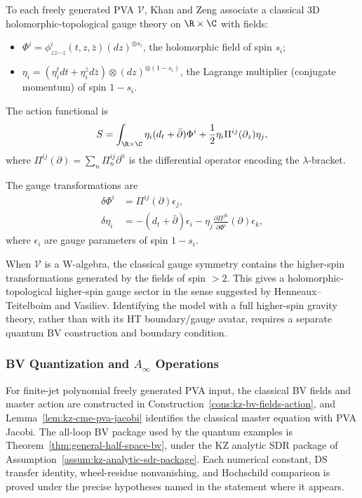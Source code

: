 \begin{construction}
To each freely generated PVA $\mathcal{V}$, Khan and Zeng associate a classical 3D holomorphic-topological gauge theory on $\R \times \C$ with fields:
\begin{itemize}
\item $\Phi^i = \phi^i_{zz\cdots z}(t,z,\bar{z})(dz)^{\otimes s_i}$, the holomorphic field of spin $s_i$;
\item $\eta_i = (\eta_i^t dt + \eta_i^{\bar{z}} d\bar{z}) \otimes (dz)^{\otimes(1-s_i)}$, the Lagrange multiplier (conjugate momentum) of spin $1-s_i$.
\end{itemize}
The action functional is
\begin{equation}
S = \int_{\R \times \C} \eta_i (d_t + \bar{\partial})\Phi^i + \frac{1}{2} \eta_i \Pi^{ij}(\partial_z) \eta_j,
\end{equation}
where $\Pi^{ij}(\partial) = \sum_n \Pi^{ij}_n \partial^n$ is the differential operator encoding the $\lambda$-bracket.

The gauge transformations are
\begin{align}
\delta \Phi^i &= \Pi^{ij}(\partial) \epsilon_j,\\
\delta \eta_i &= -(d_t + \bar{\partial})\epsilon_i - \eta_j \frac{\partial \Pi^{jk}}{\partial \Phi^i}(\partial) \epsilon_k,
\end{align}
where $\epsilon_i$ are gauge parameters of spin $1-s_i$.
\end{construction}

\begin{remark}
When $\mathcal{V}$ is a W-algebra, the classical gauge symmetry contains the higher-spin transformations generated by the fields of spin $>2$. This gives a holomorphic-topological higher-spin gauge sector in the sense suggested by Henneaux--Teitelboim and Vasiliev. Identifying the model with a full higher-spin gravity theory, rather than with its HT boundary/gauge avatar, requires a separate quantum BV construction and boundary condition.
\end{remark}

\subsubsection{BV Quantization and $A_\infty$ Operations}

\begin{remark}
For finite-jet polynomial freely generated PVA input, the classical BV
fields and master action are constructed in
Construction~\ref{cons:kz-bv-fields-action}, and
Lemma~\ref{lem:kz-cme-pva-jacobi} identifies the classical master
equation with PVA Jacobi. The all-loop BV package used by the quantum
examples is Theorem~\ref{thm:general-half-space-bv}, under the
KZ analytic SDR package of Assumption~\ref{assum:kz-analytic-sdr-package}.
Each numerical constant, DS transfer identity, wheel-residue
nonvanishing, and Hochschild comparison is proved under the precise
hypotheses named in the statement where it appears.
\end{remark}

